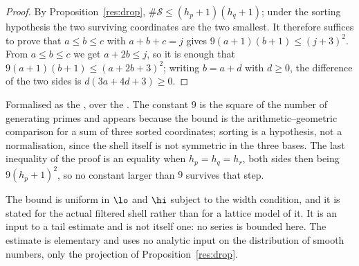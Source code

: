\begin{proof}
By Proposition~\ref{res:drop}, $\#\mathcal S\le(h_p+1)(h_q+1)$; under the
sorting hypothesis the two surviving coordinates are the two smallest.  It
therefore
suffices to prove that $a\le b\le c$ with $a+b+c=j$ gives
$9(a+1)(b+1)\le(j+3)^{2}$.  From $a\le b\le c$ we get $a+2b\le j$, so it is
enough that $9(a+1)(b+1)\le(a+2b+3)^{2}$; writing $b=a+d$ with $d\ge0$, the
difference of the two sides is $d(3a+4d+3)\ge0$.
\end{proof}

\noindent Formalised as the
, over the
.  The constant $9$ is the square of the number of
generating primes and appears because the bound is the arithmetic--geometric
comparison for a sum of three sorted coordinates; sorting is a hypothesis, not
a normalisation, since the shell itself is not symmetric in the three bases.
The last inequality of the proof is an equality when $h_p=h_q=h_r$, both sides
then being $9(h_p+1)^{2}$, so no constant larger than $9$ survives that step.

The bound is uniform in $\lo$ and $\hi$ subject to the width condition, and it
is stated for the actual filtered shell rather than for a lattice model of it.
It is an input to a tail estimate and is not itself one: no series is bounded
here.  The estimate is elementary and uses no analytic input on the
distribution of smooth numbers, only the projection of
Proposition~\ref{res:drop}.
